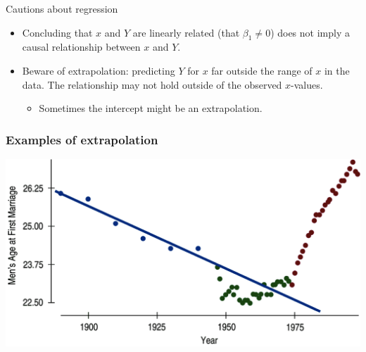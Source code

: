 \documentclass{beamer}
\begin{document}
\begin{frame}{Cautions about regression}
\begin{itemize}
\item Concluding that $x$ and $Y$ are linearly related (that $\beta_1\ne0$) does not imply a causal relationship between $x$ and $Y$. 
\item<3-> Beware of extrapolation: predicting $Y$ for $x$ far outside the range of $x$ in the data. The relationship may not hold outside of the observed $x$-values.
\begin{itemize}
\item<4-> Sometimes the intercept might be an extrapolation.
\end{itemize}
\end{itemize}
\end{frame}


\begin{frame}
\frametitle{Examples of extrapolation}

\begin{center}
\includegraphics[width=\textwidth]{plots/extrapolation}
\end{center}

\end{frame}
\end{document}
